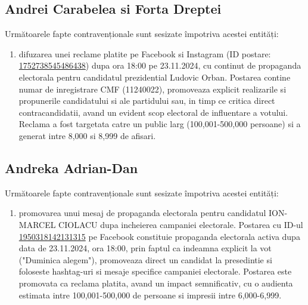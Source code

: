 \documentclass[a4paper,12pt]{article}
\begin{document}
\vspace{0.5cm}

\subsection{Andrei Carabelea si Forta Dreptei}
Următoarele fapte contravenționale sunt sesizate împotriva acestei entități:

\begin{enumerate}[leftmargin=*, label=\arabic*.)]
    \item difuzarea unei reclame platite pe Facebook si Instagram (ID postare: \href{https://www.facebook.com/ads/library/?id=1752738545486438}{1752738545486438}) dupa ora 18:00 pe 23.11.2024, cu continut de propaganda electorala pentru candidatul prezidential Ludovic Orban. Postarea contine numar de inregistrare CMF (11240022), promoveaza explicit realizarile si propunerile candidatului si ale partidului sau, in timp ce critica direct contracandidatii, avand un evident scop electoral de influentare a votului. Reclama a fost targetata catre un public larg (100,001-500,000 persoane) si a generat intre 8,000 si 8,999 de afisari.
\end{enumerate}

\vspace{0.5cm}

\subsection{Andreka Adrian-Dan}
Următoarele fapte contravenționale sunt sesizate împotriva acestei entități:

\begin{enumerate}[leftmargin=*, label=\arabic*.)]
    \item promovarea unui mesaj de propaganda electorala pentru candidatul ION-MARCEL CIOLACU dupa incheierea campaniei electorale. Postarea cu ID-ul \href{https://www.facebook.com/ads/library/?id=1950318142131315}{1950318142131315} pe Facebook constituie propaganda electorala activa dupa data de 23.11.2024, ora 18:00, prin faptul ca indeamna explicit la vot ("Duminica alegem"), promoveaza direct un candidat la presedintie si foloseste hashtag-uri si mesaje specifice campaniei electorale. Postarea este promovata ca reclama platita, avand un impact semnificativ, cu o audienta estimata intre 100,001-500,000 de persoane si impresii intre 6,000-6,999.
\end{enumerate}

\vspace{0.5cm}
\end{document}
